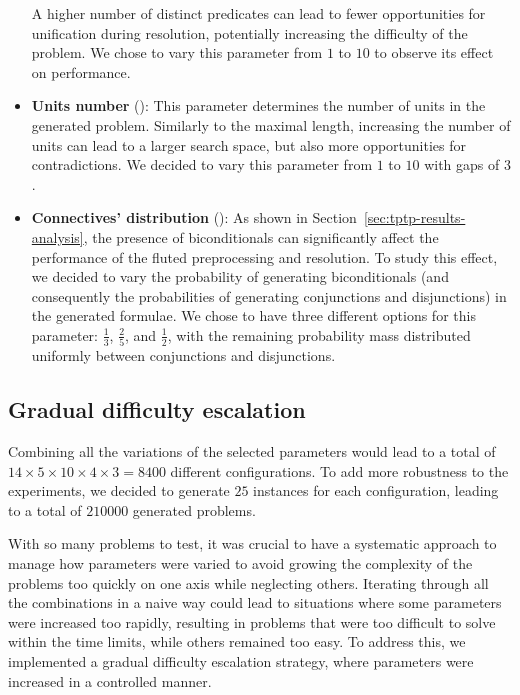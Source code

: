 \begin{itemize}
                                                  A higher number of distinct predicates can lead to fewer opportunities for unification during resolution, potentially increasing the difficulty of the problem.
                                                  We chose to vary this parameter from \(1\) to \(10\) to observe its effect on performance.
\item \textbf{Units number} (): This parameter determines the number of units in the generated problem.
                                                Similarly to the maximal length, increasing the number of units can lead to a larger search space, but also more opportunities for contradictions.
                                                We decided to vary this parameter from \(1\) to \(10\) with gaps of \(3\).
\item \textbf{Connectives' distribution} (): As shown in Section~\ref{sec:tptp-results-analysis}, the presence of biconditionals can significantly affect the performance of the fluted preprocessing and resolution.
                                                            To study this effect, we decided to vary the probability of generating biconditionals (and consequently the probabilities of generating conjunctions and disjunctions) in the generated formulae.
                                                            We chose to have three different options for this parameter: \(\frac{1}{3}\), \(\frac{2}{5}\), and \(\frac{1}{2}\), with the remaining probability mass distributed uniformly between conjunctions and disjunctions.

\end{itemize}
\subsection{Gradual difficulty escalation}\label{subsec:gradual-difficulty-escalation}

Combining all the variations of the selected parameters would lead to a total of \(14 \times 5 \times 10 \times 4 \times 3 = 8400\) different configurations.
To add more robustness to the experiments, we decided to generate \(25\) instances for each configuration, leading to a total of \(210000\) generated problems.

With so many problems to test, it was crucial to have a systematic approach to manage how parameters were varied to avoid growing the complexity of the problems too quickly on one axis while neglecting others.
Iterating through all the combinations in a naive way could lead to situations where some parameters were increased too rapidly, resulting in problems that were too difficult to solve within the time limits, while others remained too easy.
To address this, we implemented a gradual difficulty escalation strategy, where parameters were increased in a controlled manner.

